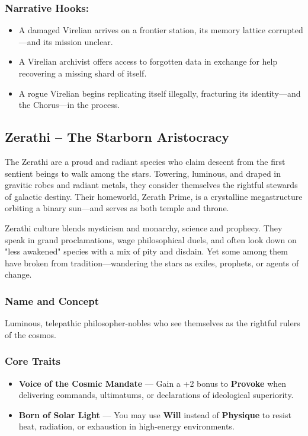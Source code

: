 \subsubsection{Narrative Hooks:}
\begin{itemize}
  \item A damaged Virelian arrives on a frontier station, its memory lattice corrupted—and its mission unclear.
  \item A Virelian archivist offers access to forgotten data in exchange for help recovering a missing shard of itself.
  \item A rogue Virelian begins replicating itself illegally, fracturing its identity—and the Chorus—in the process.
\end{itemize}


\subsection*{Zerathi – The Starborn Aristocracy}

The Zerathi are a proud and radiant species who claim descent from the first sentient beings to walk among the stars. Towering, luminous, and draped in gravitic robes and radiant metals, they consider themselves the rightful stewards of galactic destiny. Their homeworld, Zerath Prime, is a crystalline megastructure orbiting a binary sun—and serves as both temple and throne.

Zerathi culture blends mysticism and monarchy, science and prophecy. They speak in grand proclamations, wage philosophical duels, and often look down on "less awakened" species with a mix of pity and disdain. Yet some among them have broken from tradition—wandering the stars as exiles, prophets, or agents of change.

\subsubsection{Name and Concept}

Luminous, telepathic philosopher-nobles who see themselves as the rightful rulers of the cosmos.

\subsubsection*{Core Traits}
\begin{itemize}
  \item \textbf{Voice of the Cosmic Mandate} — Gain a +2 bonus to \textbf{Provoke} when delivering commands, ultimatums, or declarations of ideological superiority.

  \item \textbf{Born of Solar Light} — You may use \textbf{Will} instead of \textbf{Physique} to resist heat, radiation, or exhaustion in high-energy environments.
\end{itemize}

